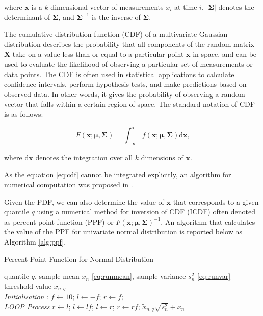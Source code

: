 where $\boldsymbol{x}$ is a $k$-dimensional vector of measurements $x_i$ at time $i$, $|\boldsymbol{\Sigma}|$ denotes the determinant of $\boldsymbol{\Sigma}$, and $\boldsymbol{\Sigma}^{-1}$ is the inverse of $\boldsymbol{\Sigma}$.

The cumulative distribution function (CDF) of a multivariate Gaussian distribution describes the probability that all components of the random matrix \(\boldsymbol{X}\) take on a value less than or equal to a particular point \(\boldsymbol{x}\) in space, and can be used to evaluate the likelihood of observing a particular set of measurements or data points. The CDF is often used in statistical applications to calculate confidence intervals, perform hypothesis tests, and make predictions based on observed data. In other words, it gives the probability of observing a random vector that falls within a certain region of space. The standard notation of CDF is as follows:

\begin{equation}
F(\boldsymbol{x}; \boldsymbol{\mu}, \boldsymbol{\Sigma}) = \int_{-\infty}^{\boldsymbol{x}} f(\boldsymbol{x}; \boldsymbol{\mu}, \boldsymbol{\Sigma})  \text{d}\boldsymbol{x}\text{,}\label{eq:cdf}
\end{equation}

where $\text{d}\boldsymbol{x}$ denotes the integration over all $k$ dimensions of $\boldsymbol{x}$. 

As the equation \eqref{eq:cdf} cannot be integrated explicitly, an algorithm for numerical computation was proposed in \cite{Genz2000}.


Given the PDF, we can also determine the value of \(\boldsymbol{x}\) that corresponds to a given quantile $q$  using a numerical method for inversion of CDF (ICDF) often denoted as percent point function (PPF) or $F(\boldsymbol{x}; \boldsymbol{\mu}, \boldsymbol{\Sigma})^{-1}$. An algorithm that calculates the value of the PPF for univariate normal distribution is reported below as Algorithm \ref{alg:ppf}.

\begin{algorithm}[H]
\caption{{Percent-Point Function for Normal Distribution}} \label{alg:ppf}
 \begin{algorithmic}[1]
 \renewcommand{\algorithmicrequire}{\textbf{Input:}}
 \renewcommand{\algorithmicensure}{\textbf{Output:}}
 \REQUIRE quantile $q$, sample mean $\bar x_n$ \eqref{eq:runmean}, sample variance $s^2_n$ \eqref{eq:runvar}
 \ENSURE  threshold value $x_{n,q}$
 \\ \textit{Initialisation} : 
  \STATE $f \leftarrow 10$; $l \leftarrow -f $; $r \leftarrow f;$
 \\ \textit{LOOP Process}
  \STATE $r \leftarrow l $;
  \STATE $l \leftarrow lf $;
  \ENDWHILE
    \STATE $l \leftarrow r $;
    \STATE $r \leftarrow rf $;
  \ENDWHILE
 \RETURN $\tilde{x}_{n,q}  \sqrt{s^2_n} + \bar x_n $
 \end{algorithmic}
\end{algorithm}

